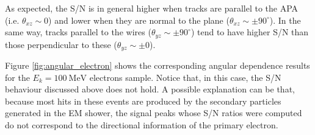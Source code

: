 As expected, the S/N is in general higher when tracks are parallel to the APA (i.e. $\theta_{xz} \sim 0$) and lower when they are normal to the plane ($\theta_{xz} \sim \pm 90^{\circ}$). In the same way, tracks parallel to the wires ($\theta_{yz} \sim \pm 90^{\circ}$) tend to have higher S/N than those perpendicular to these ($\theta_{yz} \sim \pm 0$).

Figure \ref{fig:angular_electron} shows the corresponding angular dependence results for the $E_{k}=100 \ \mathrm{MeV}$ electrons sample. Notice that, in this case, the S/N behaviour discussed above does not hold. A possible explanation can be that, because most hits in these events are produced by the secondary particles generated in the EM shower, the signal peaks whose S/N ratios were computed do not correspond to the directional information of the primary electron.

